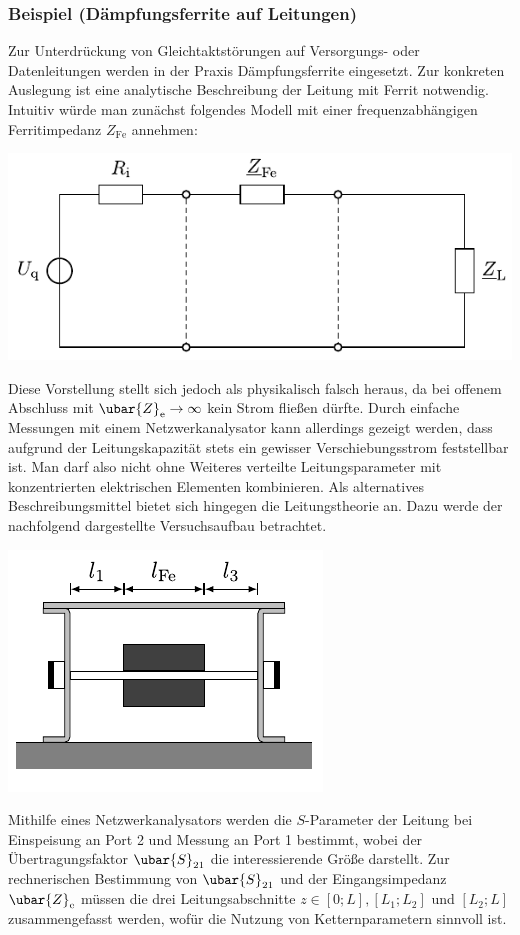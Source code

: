 \subsubsection{Beispiel (Dämpfungsferrite auf Leitungen)}
Zur Unterdrückung von Gleichtaktstörungen auf Versorgungs- oder Datenleitungen werden in der Praxis Dämpfungsferrite eingesetzt. Zur konkreten Auslegung ist eine analytische Beschreibung der Leitung mit Ferrit notwendig. Intuitiv würde man zunächst folgendes Modell mit einer frequenzabhängigen Ferritimpedanz $Z_{\mathrm{Fe}}$ annehmen:
\begin{center}
	\includegraphics{res/LT51}
\end{center}
Diese Vorstellung stellt sich jedoch als physikalisch falsch heraus, da bei offenem Abschluss mit $\ubar{Z}_{\mathrm{e}} \rightarrow \infty$ kein Strom fließen dürfte. Durch einfache Messungen mit einem Netzwerkanalysator kann allerdings gezeigt werden, dass aufgrund der Leitungskapazität stets ein gewisser Verschiebungsstrom feststellbar ist. Man darf also nicht ohne Weiteres verteilte Leitungsparameter mit konzentrierten elektrischen Elementen kombinieren.
Als alternatives Beschreibungsmittel bietet sich hingegen die Leitungstheorie an. Dazu werde der nachfolgend dargestellte Versuchsaufbau betrachtet.
\begin{center}
	\includegraphics{res/LT52}
\end{center}
Mithilfe eines Netzwerkanalysators werden die $S$-Parameter der Leitung bei Einspeisung an Port 2 und Messung an Port 1 bestimmt, wobei der Übertragungsfaktor $\ubar{S}_{21}$ die interessierende Größe darstellt. Zur rechnerischen Bestimmung von $\ubar{S}_{21}$ und der Eingangsimpedanz $\ubar{Z}_{\mathrm{e}}$ müssen die drei Leitungsabschnitte $z \in[0 ; L],\left[L_{1} ; L_{2}\right]$ und $\left[L_{2} ; L\right]$ zusammengefasst werden, wofür die Nutzung von Ketternparametern sinnvoll ist.
